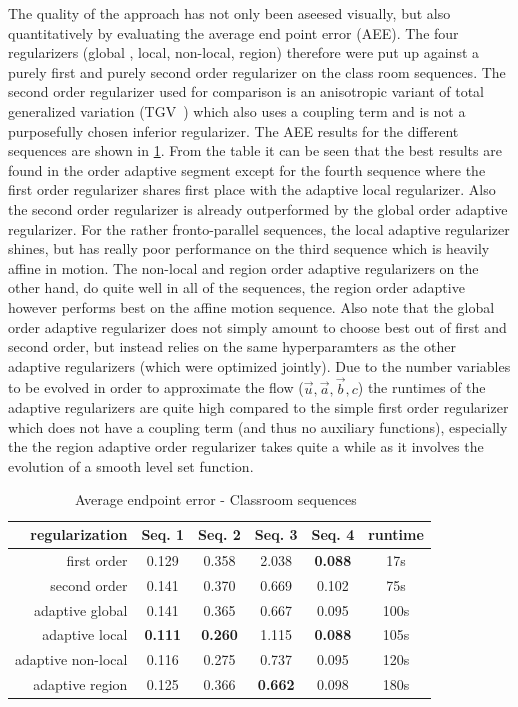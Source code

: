 \documentclass[journal]{vgtc}
\newcommand{\flow}{\vec{u}}
\newcommand{\aaux}{\vec{a}}
\newcommand{\baux}{\vec{b}}
\begin{document}
The quality of the approach has not only been aseesed visually, but also quantitatively by evaluating the average end point error (AEE).
The four regularizers (global , local, non-local, region) therefore were put up against a purely first and purely second order regularizer on the class room sequences.
The second order regularizer used for comparison is an anisotropic variant of total generalized variation (TGV~\cite{tgv}) which also uses a coupling term and is not a purposefully chosen inferior regularizer.  
The AEE results for the different sequences are shown in \cref{tbl:classroom_aee}.
From the table it can be seen that the best results are found in the order adaptive segment except for the fourth sequence where the first order regularizer shares first place with the adaptive local regularizer.
Also the second order regularizer is already outperformed by the global order adaptive regularizer.
For the rather fronto-parallel sequences, the local adaptive regularizer shines, but has really poor performance on the third sequence which is heavily affine in motion.
The non-local and region order adaptive regularizers on the other hand, do quite well in all of the sequences, the region order adaptive however performs best on the affine motion sequence.
Also note that the global order adaptive regularizer does not simply amount to choose best out of first and second order, but instead relies on the same hyperparamters as the other adaptive regularizers (which were optimized jointly).
Due to the number variables to be evolved in order to approximate the flow ($\flow, \aaux, \baux, c$) the runtimes of the adaptive regularizers are quite high compared to the simple first order regularizer which does not have a coupling term (and thus no auxiliary functions), especially the the region adaptive order regularizer takes quite a while as it involves the evolution of a smooth level set function.  

\begin{table}[htb]
\caption{\label{tbl:classroom_aee} Average endpoint error - Classroom sequences~\cite{daspaper}}
\scriptsize
\begin{center}
\begin{tabular}{r|cccc|c}
regularization & Seq. 1 & Seq. 2 & Seq. 3 & Seq. 4 & runtime 
\\\hline
first order        & 0.129 & 0.358 & 2.038 & \textbf{0.088} & 17s
\\
second order       & 0.141 & 0.370 & 0.669 & 0.102 & 75s
\\\hline
adaptive global    & 0.141 & 0.365 & 0.667 & 0.095 & 100s
\\
adaptive local     & \textbf{0.111} & \textbf{0.260} & 1.115 & \textbf{0.088} & 105s
\\
adaptive non-local & 0.116 & 0.275 & 0.737 & 0.095 & 120s
\\
adaptive region    & 0.125 & 0.366 & \textbf{0.662} & 0.098 & 180s
\end{tabular}
\end{center}
\end{table}
\end{document}
